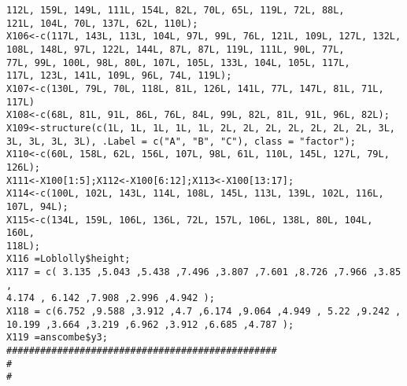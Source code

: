 \documentclass[a4paper,12pt]{article}
\begin{document}
\begin{verbatim}
112L, 159L, 149L, 111L, 154L, 82L, 70L, 65L, 119L, 72L, 88L, 
121L, 104L, 70L, 137L, 62L, 110L);
X106<-c(117L, 143L, 113L, 104L, 97L, 99L, 76L, 121L, 109L, 127L, 132L, 
108L, 148L, 97L, 122L, 144L, 87L, 87L, 119L, 111L, 90L, 77L, 
77L, 99L, 100L, 98L, 80L, 107L, 105L, 133L, 104L, 105L, 117L, 
117L, 123L, 141L, 109L, 96L, 74L, 119L);
X107<-c(130L, 79L, 70L, 118L, 81L, 126L, 141L, 77L, 147L, 81L, 71L, 117L)
X108<-c(68L, 81L, 91L, 86L, 76L, 84L, 99L, 82L, 81L, 91L, 96L, 82L);
X109<-structure(c(1L, 1L, 1L, 1L, 1L, 2L, 2L, 2L, 2L, 2L, 2L, 2L, 3L, 
3L, 3L, 3L, 3L), .Label = c("A", "B", "C"), class = "factor");
X110<-c(60L, 158L, 62L, 156L, 107L, 98L, 61L, 110L, 145L, 127L, 79L, 
126L);
X111<-X100[1:5];X112<-X100[6:12];X113<-X100[13:17];
X114<-c(100L, 102L, 143L, 114L, 108L, 145L, 113L, 139L, 102L, 116L, 
107L, 94L);
X115<-c(134L, 159L, 106L, 136L, 72L, 157L, 106L, 138L, 80L, 104L, 160L, 
118L);
X116 =Loblolly$height;
X117 = c( 3.135 ,5.043 ,5.438 ,7.496 ,3.807 ,7.601 ,8.726 ,7.966 ,3.85 ,
4.174 , 6.142 ,7.908 ,2.996 ,4.942 );
X118 = c(6.752 ,9.588 ,3.912 ,4.7 ,6.174 ,9.064 ,4.949 , 5.22 ,9.242 ,
10.199 ,3.664 ,3.219 ,6.962 ,3.912 ,6.685 ,4.787 );
X119 =anscombe$y3;
################################################
#
#


\end{verbatim}
\end{document}
